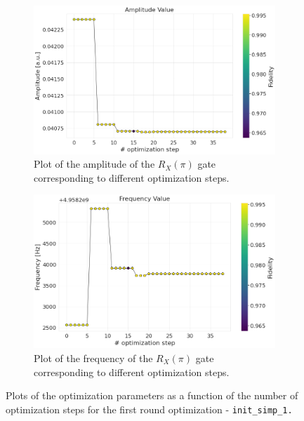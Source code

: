\begin{figure}[h!]
    \centering
    \begin{subfigure}[t]{0.495\textwidth}
        \includegraphics[width=\textwidth]{figures/png/RB_optimization/NM/InitialSymplex/20241110_211211/amplitude.png}
        \caption{Plot of the amplitude of the $R_X(\pi)$ gate corresponding to different optimization steps.}
        \label{fig:20241110_211211:amplitude}
    \end{subfigure}
    \hfill
    \begin{subfigure}[t]{0.495\textwidth}
        \includegraphics[width=\textwidth]{figures/png/RB_optimization/NM/InitialSymplex/20241110_211211/frequency.png}
        \caption{Plot of the frequency of the $R_X(\pi)$ gate corresponding to different optimization steps.}
        \label{fig:20241110_211211:frequency}
    \end{subfigure}
    \caption{Plots of the optimization parameters as a function of the number of optimization steps for the first round optimization - \tt{init\_simp\_1}.}
    \label{fig:20241110_211211:parameters}
\end{figure}

